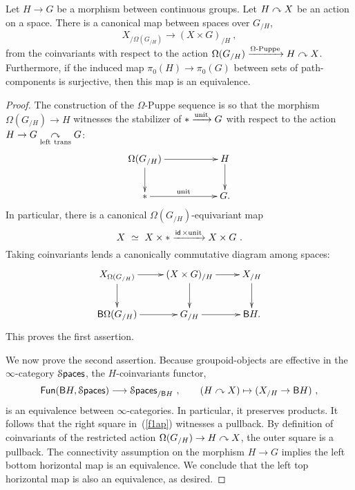 \begin{lemma}
\label{t66}
Let $H \to G$ be a morphism between continuous groups.
Let $H\curvearrowright X$ be an action on a space.  
There is a canonical map between spaces over $G_{/H}$, 
\[
X_{/\Omega(G_{/H})}
\longrightarrow 
(X \times G)_{/H}
~,
\]
from the coinvariants with respect to the action 
$
\Omega (G_{/H})
\xrightarrow{\Omega\text{-\rm Puppe}}
H
\curvearrowright
X
$.
Furthermore, if the induced map $\pi_0(H)\to \pi_0(G)$ between sets of path-components is surjective, then this map is an equivalence.

\end{lemma}

\begin{proof}
The construction of the $\Omega$-Puppe sequence is so that the morphism 
$
\Omega (G_{/H})
\to 
H
$
witnesses the stabilizer of $\ast \xrightarrow{\rm unit} G$ with respect to the action $H \to G \underset{\rm left~trans}{\curvearrowright} G$:
\[
\xymatrix{
\Omega (G_{/H})
\ar[rr]
\ar[d]
&&
H
\ar[d]
\\
\ast
\ar[rr]^-{\rm unit}
&&
G
.
}
\]
In particular, there is a canonical $\Omega (G_{/H})$-equivariant map
\[
X
~\simeq~
X\times \ast
\xrightarrow{ \operatorname{\sf id} \times {\rm unit}}
X \times G
~.
\]
Taking coinvariants lends a canonically commutative diagram among spaces:
\begin{equation}
\label{f1ap}
\xymatrix{
X_{ \Omega (G_{/H}) }
\ar[d]
\ar[r]
&
(X \times  G)_{/H}
\ar[r]
\ar[d]
&
X_{/H}
\ar[d]
\\
\sB \Omega (G_{/H})
\ar[r]
&
G_{/H}
\ar[r]
&
\sB H
.
}
\end{equation}
This proves the first assertion.

We now prove the second assertion.
Because groupoid-objects are effective in the $\infty$-category $\operatorname{\mathcal S\mathsf{paces}}$,
the $H$-coinvariants functor,
\[
\operatorname{{\sf Fun}} ( \mathsf B H , \operatorname{\mathcal S\mathsf{paces}} )
\longrightarrow
\operatorname{\mathcal S\mathsf{paces}}_{/\mathsf B H}
~,\qquad
(H \curvearrowright X)
\mapsto 
( X_{/H} \to \mathsf B H)
~,
\]
is an equivalence between $\infty$-categories.
In particular, it preserves products.
It follows that the right square in~(\ref{f1ap}) witnesses a pullback.  
By definition of coinvariants of the restricted action $\Omega (G_{/H}) \to H \curvearrowright X$, the outer square is a pullback.  
The connectivity assumption on the morphism $H\to G$ implies the left bottom horizontal map is an equivalence.  
We conclude that the left top horizontal map is also an equivalence, as desired.  

\end{proof}





